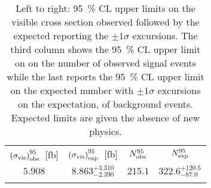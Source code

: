 
\begin{table}
\centering
\begin{tabular}{cccc}
\noalign{\smallskip}\toprule\noalign{\smallskip}
$\left({\rm \sigma_{\rm vis}}\right)_{\rm obs}^{95}$~[fb] &$\left({\rm \sigma_{\rm vis}}\right)_{\rm exp}^{95}$~[fb] &  $N_{\rm obs}^{95}$  & $N_{\rm exp}^{95}$  \\
\noalign{\smallskip}\midrule\noalign{\smallskip}
$5.908$ &${ 8.863 }^{ +3.310 }_{ -2.390 } $ &  $215.1$ & $ { 322.6 }^{ +120.5 }_{ -87.0 }$ \\
 
 
\noalign{\smallskip}\bottomrule\noalign{\smallskip}
\end{tabular}
\caption[Breakdown of upper limits.]{
Left to right:  \SI{95}{\percent} CL upper limits on the visible cross section observed
followed by the expected
reporting the $\pm 1\sigma$
excursions. The third column shows the \SI{95}{\percent} CL upper limit on on the number of observed
signal events while the last reports the \SI{95}{\percent} CL upper limit on the expected number with $\pm 1\sigma$
excursions on the expectation, of background events.
Expected limits are given the absence of new physics.
\label{table.results.exclxsec.pval.upperlimit.SR}}
\end{table}
%